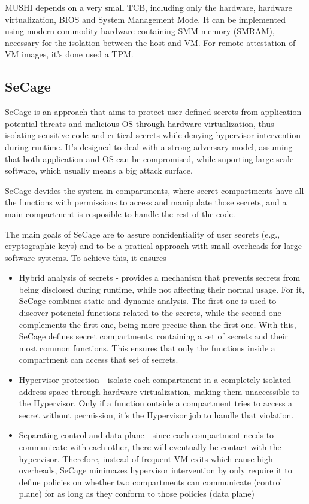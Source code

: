MUSHI depends on a very small TCB, including only the hardware, hardware virtualization, BIOS and System Management Mode. It can be implemented using modern commodity hardware containing SMM memory (SMRAM), necessary for the isolation between the host and VM. For remote attestation of VM images, it's done used a TPM. \cite{mushiPaper}


\subsection{SeCage}
\label{ssec:secage}

SeCage \cite{SeCagePaper} is an approach that aims to protect user-defined secrets from application potential threats and malicious OS through hardware virtualization, thus isolating sensitive code and critical secrets while denying hypervisor intervention during runtime.
It's designed to deal with a strong adversary model, assuming that both application and OS can be compromised, while suporting large-scale software, which usually means a big attack surface.

SeCage devides the system in compartments, where secret compartments have all the functions with permissions to access and manipulate those secrets, and a main compartment is resposible to handle the rest of the code.

The main goals of SeCage are to assure confidentiality of user secrets (e.g., cryptographic keys) and to be a pratical approach with small overheads for large software systems. To achieve this, it ensures

\begin{itemize}
	\item Hybrid analysis of secrets - provides a mechanism that prevents secrets from being disclosed during runtime, while not affecting their normal usage. For it, SeCage combines static and dynamic analysis. The first one is used to discover potencial functions related to the secrets, while the second one complements the first one, being more precise than the first one. With this, SeCage defines secret compartments, containing a set of secrets and their most common functions. This ensures that only the functions inside a compartment can access that set of secrets.  
	\item Hypervisor protection - isolate each compartment in a completely isolated address space through hardware virtualization, making them unaccessible to the Hypervisor. Only if a function outside a compartment tries to access a secret without permission, it's the Hypervisor job to handle that violation.
	\item Separating control and data plane - since each compartment needs to communicate with each other, there will eventually be contact with the hypervisor. Therefore, instead of frequent VM exits which cause high overheads, SeCage minimazes hypervisor intervention by only require it to define policies on whether two compartments can communicate (control plane) for as long as they conform to those policies (data plane)
	
\end{itemize}

